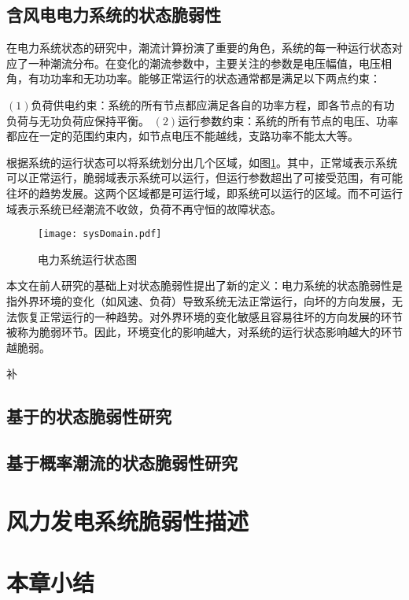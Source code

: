 \subsection{含风电电力系统的状态脆弱性}
\label{sec:vulneStaus}
在电力系统状态的研究中，潮流计算扮演了重要的角色，系统的每一种运行状态对应了一种潮流分布。在变化的潮流参数中，主要关注的参数是电压幅值，电压相角，有功功率和无功功率。能够正常运行的状态通常都是满足以下两点约束：

$(1)$负荷供电约束：系统的所有节点都应满足各自的功率方程，即各节点的有功负荷与无功负荷应保持平衡。
$(2)$运行参数约束：系统的所有节点的电压、功率都应在一定的范围约束内，如节点电压不能越线，支路功率不能太大等。

根据系统的运行状态可以将系统划分出几个区域，如图\ref{fig:sysDomain}。其中，正常域表示系统可以正常运行，脆弱域表示系统可以运行，但运行参数超出了可接受范围，有可能往坏的趋势发展。这两个区域都是可运行域，即系统可以运行的区域。而不可运行域表示系统已经潮流不收敛，负荷不再守恒的故障状态。
\begin{figure}[H] %
  \centering
  \texttt{[image: sysDomain.pdf]}
  \caption{电力系统运行状态图}
  \label{fig:sysDomain}
\end{figure}

本文在前人研究的基础上对状态脆弱性提出了新的定义：电力系统的状态脆弱性是指外界环境的变化（如风速、负荷）导致系统无法正常运行，向坏的方向发展，无法恢复正常运行的一种趋势。对外界环境的变化敏感且容易往坏的方向发展的环节被称为脆弱环节。因此，环境变化的影响越大，对系统的运行状态影响越大的环节越脆弱。

补

\subsection{基于的状态脆弱性研究}
\label{sec:dynamic}

\subsection{基于概率潮流的状态脆弱性研究}
\label{sec:static}


\section{风力发电系统脆弱性描述}
\label{sec:defina}

\section{本章小结}
\label{sec:sum3} 